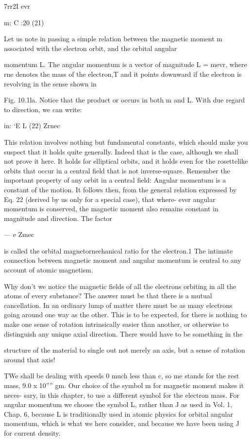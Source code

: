 {{7rr2I evr

m: C :20 (21)

Let us note in passing a simple relation between the magnetic
moment m associated with the electron orbit, and the orbital angular

momentum L. The angular momentum is a vector of magnitude
L = mevr, where rne denotes the mass of the electron,T and it points
downward if the electron is revolving in the sense shown in

Fig. 10.1la. Notice that the product or occurs in both m and L.
With due regard to direction, we can write:

in: ‘E L (22)
Zrnec

This relation involves nothing but fundamental constants, which
should make you suspect that it holds quite generally. Indeed that
is the case, although we shall not prove it here. It holds for elliptical
orbits, and it holds even for the rosettelike orbits that occur in a
central field that is not inverse-square. Remember the important
property of any orbit in a central field: Angular momentum is a constant
of the motion. It follows then, from the general relation expressed
by Eq. 22 (derived by us only for a special case), that where-
ever angular momentum is conserved, the magnetic moment also
remains constant in magnitude and direction. The factor

 ---  e
Zmec

is called the orbital magnetornechanical ratio for the electron.1 The
intimate connection between magnetic moment and angular momentum
is central to any account of atomic magnetism.

Why don't we notice the magnetic fields of all the electrons orbiting
in all the atoms of every substance? The answer must be that
there is a mutual cancellation. In an ordinary lump of matter there
must be as many electrons going around one way as the other. This
is to be expected, for there is nothing to make one sense of rotation
intrinsically easier than another, or otherwise to distinguish any
unique axial direction. There would have to be something in the

structure of the material to single out not merely an axis, but a sense
of rotation around that axis!

TWe shall be dealing with speeds 0 much less than c, so me stands for the rest mass,
9.0 x 10'''' gm. Our choice of the symbol m for magnetic moment makes it neces-
sary, in this chapter, to use a different symbol for the electron mass. For angular
momentum we choose the symbol L, rather than J as used in Vol. 1, Chap. 6, because
L is traditionally used in atomic physics for orbital angular momentum, which is what
we here consider, and because we have been using J for current density.

}}
